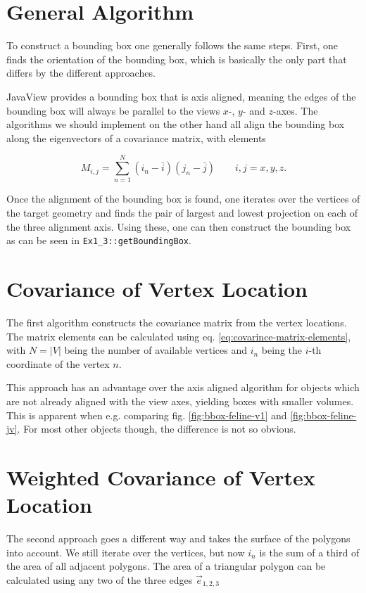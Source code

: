 \documentclass[a4paper,10pt,notitlepage]{scrreprt}
\begin{document}
\section{General Algorithm}

To construct a bounding box one generally follows the same steps. First, one
finds the orientation of the bounding box, which is basically the only part
that differs by the different approaches.

JavaView provides a bounding box that is axis aligned, meaning the edges
of the bounding box will always be parallel to the views $x$-, $y$- and
$z$-axes. The algorithms we should implement on the other hand all align the
bounding box along the eigenvectors of a covariance matrix, with elements

\begin{equation}
 M_{i,j} = \sum_{n=1}^N (i_n - \bar{i})(j_n - \bar{j}) \qquad i,j = x,y,z.
 \label{eq:covarince-matrix-elements}
\end{equation}

Once the alignment of the bounding box is found, one iterates over the vertices
of the target geometry and finds the pair of largest and lowest projection on
each of the three alignment axis. Using these, one can then construct the
bounding box as can be seen in \texttt{Ex1\_3::getBoundingBox}.

\section{Covariance of Vertex Location}

The first algorithm constructs the covariance matrix from the vertex locations.
The matrix elements can be calculated using eq.
\ref{eq:covarince-matrix-elements}, with $N = |V|$ being the number of
available vertices and $i_n$ being the $i$-th coordinate of the vertex $n$.

This approach has an advantage over the axis aligned algorithm for objects
which are not already aligned with the view axes, yielding boxes with smaller
volumes. This is apparent when e.g. comparing fig. \ref{fig:bbox-feline-v1} and
\ref{fig:bbox-feline-jv}. For most other objects though, the difference is not
so obvious.

\section{Weighted Covariance of Vertex Location}

The second approach goes a different way and takes the surface of the polygons
into account. We still iterate over the vertices, but now $i_n$ is the sum of a
third of the area of all adjacent polygons. The area of a triangular polygon
can be calculated using any two of the three edges $\vec{e}_{1,2,3}$
\end{document}
